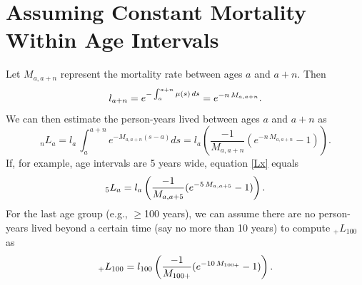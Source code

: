 \documentclass[11pt,letterpaper]{article}
\theoremstyle{plain}
\theoremstyle{remark}
\numberwithin{equation}{section}
\begin{document}
\section{Assuming Constant Mortality Within Age Intervals}
Let $M_{a,a+n}$ represent the mortality rate between ages $a$ and
$a+n$. Then
\begin{equation}
l_{a+n}=e^{-\int_a^{a+n}\mu(s)\,ds}=e^{-n\,M_{a,a+n}}.\notag
\end{equation}
We can then estimate the person-years lived between ages $a$ and $a+n$
as
\begin{equation}
_nL_{a}=l_a\,\int_a^{a+n} e^{-M_{a,a+n}(s-a)} ds=l_a \left(\frac{-1}{M_{a,a+n}}(e^{-n\,M_{a,a+n}}-1) \right).
\label{Lx}
\end{equation}
If, for example, age intervals are 5 years wide, equation \eqref{Lx}
equals
\begin{equation}
_5L_{a}=l_a \left(\frac{-1}{M_{a,a+5}}(e^{-5\,M_{a,a+5}}-1) \right).\notag
\end{equation}
For the last age group (e.g., $\geq$100 years), we can assume there
are no person-years lived beyond a certain time (say no more than 10
years) to compute $_+L_{100}$ as
\begin{equation}
_+L_{100}=l_{100} \left(\frac{-1}{M_{100+}}(e^{-10\,M_{100+}}-1) \right).\notag
\end{equation}


\newpage
\end{document}

